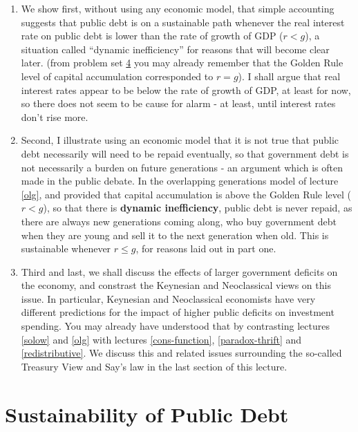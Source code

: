 \documentclass[]{book}
\begin{document}
\begin{enumerate}
\def\labelenumi{\arabic{enumi}.}
\item
  We show first, without using any economic model, that simple
  accounting suggests that public debt is on a sustainable path whenever
  the real interest rate on public debt is lower than the rate of growth
  of GDP (\(r<g\)), a situation called ``dynamic inefficiency'' for
  reasons that will become clear later. (from problem set
  \protect\hyperlink{pset4}{4} you may already remember that the Golden
  Rule level of capital accumulation corresponded to \(r=g\)). I shall
  argue that real interest rates appear to be below the rate of growth
  of GDP, at least for now, so there does not seem to be cause for alarm
  - at least, until interest rates don't rise more.
\item
  Second, I illustrate using an economic model that it is not true that
  public debt necessarily will need to be repaid eventually, so that
  government debt is not necessarily a burden on future generations - an
  argument which is often made in the public debate. In the overlapping
  generations model of lecture \ref{olg}, and provided that capital
  accumulation is above the Golden Rule level (\(r<g\)), so that there
  is \textbf{dynamic inefficiency}, public debt is never repaid, as
  there are always new generations coming along, who buy government debt
  when they are young and sell it to the next generation when old. This
  is sustainable whenever \(r \leq g\), for reasons laid out in part
  one.
\item
  Third and last, we shall discuss the effects of larger government
  deficits on the economy, and constrast the Keynesian and Neoclassical
  views on this issue. In particular, Keynesian and Neoclassical
  economists have very different predictions for the impact of higher
  public deficits on investment spending. You may already have
  understood that by contrasting lectures \ref{solow} and \ref{olg} with
  lectures \ref{cons-function}, \ref{paradox-thrift} and
  \ref{redistributive}. We discuss this and related issues surrounding
  the so-called Treasury View and Say's law in the last section of this
  lecture.
\end{enumerate}

\section{Sustainability of Public
Debt}\label{sustainability-of-public-debt}
\end{document}
